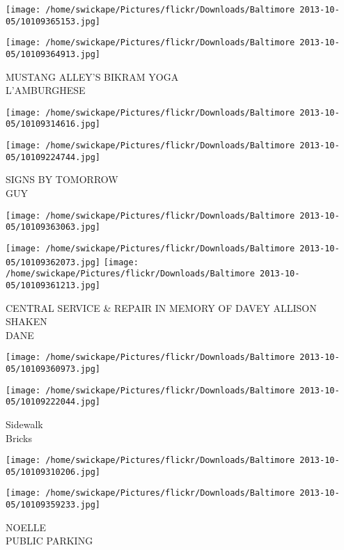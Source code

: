 \documentclass[10pt,letterpaper]{article}
\begin{document}
\texttt{[image: /home/swickape/Pictures/flickr/Downloads/Baltimore 2013-10-05/10109365153.jpg]}

\vspace{0.25in}
\texttt{[image: /home/swickape/Pictures/flickr/Downloads/Baltimore 2013-10-05/10109364913.jpg]}

MUSTANG ALLEY'S BIKRAM YOGA\\
L'AMBURGHESE
\pagebreak

\texttt{[image: /home/swickape/Pictures/flickr/Downloads/Baltimore 2013-10-05/10109314616.jpg]}

\vspace{0.25in}
\texttt{[image: /home/swickape/Pictures/flickr/Downloads/Baltimore 2013-10-05/10109224744.jpg]}

SIGNS BY TOMORROW\\
GUY
\pagebreak

\texttt{[image: /home/swickape/Pictures/flickr/Downloads/Baltimore 2013-10-05/10109363063.jpg]}

\vspace{0.25in}
\texttt{[image: /home/swickape/Pictures/flickr/Downloads/Baltimore 2013-10-05/10109362073.jpg]}
\texttt{[image: /home/swickape/Pictures/flickr/Downloads/Baltimore 2013-10-05/10109361213.jpg]}

CENTRAL SERVICE \& REPAIR IN MEMORY OF DAVEY ALLISON\\
SHAKEN\\
DANE
\pagebreak

\texttt{[image: /home/swickape/Pictures/flickr/Downloads/Baltimore 2013-10-05/10109360973.jpg]}

\vspace{0.25in}
\texttt{[image: /home/swickape/Pictures/flickr/Downloads/Baltimore 2013-10-05/10109222044.jpg]}

Sidewalk\\
Bricks
\pagebreak

\texttt{[image: /home/swickape/Pictures/flickr/Downloads/Baltimore 2013-10-05/10109310206.jpg]}

\vspace{0.25in}
\texttt{[image: /home/swickape/Pictures/flickr/Downloads/Baltimore 2013-10-05/10109359233.jpg]}

NOELLE\\
PUBLIC PARKING
\pagebreak
\end{document}
